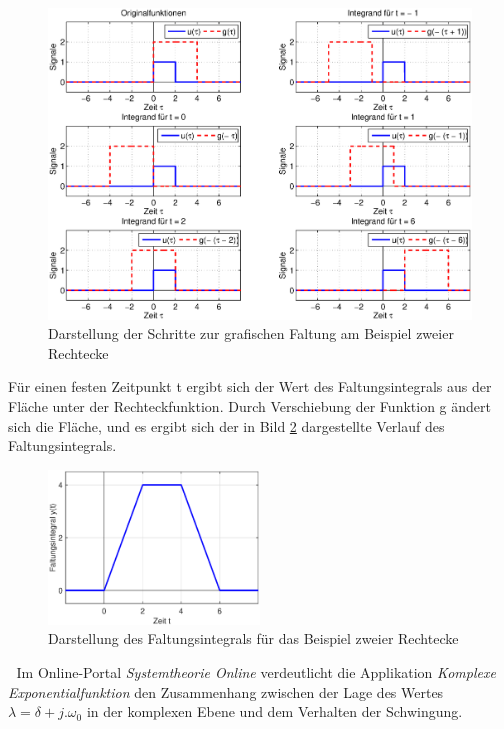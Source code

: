 \begin{figure}[H]
  \centerline{\includegraphics[width=1\textwidth]{Kapitel2/Bilder/image18}}
  \caption{Darstellung der Schritte zur grafischen Faltung am Beispiel zweier Rechtecke}
  \label{fig:FaltungGrafischRechtecke}
\end{figure}

\noindent Für einen festen Zeitpunkt t ergibt sich der Wert des Faltungsintegrals aus der Fläche unter der Rechteckfunktion. Durch Verschiebung der Funktion g ändert sich die Fläche, und es ergibt sich der in 
Bild \ref{fig:FaltungGrafischRechteckeBSP} dargestellte Verlauf des Faltungsintegrals.

\begin{figure}[H]
  \centerline{\includegraphics[width=0.5\textwidth]{Kapitel2/Bilder/image19}}
  \caption{Darstellung des Faltungsintegrals für das Beispiel zweier Rechtecke}
  \label{fig:FaltungGrafischRechteckeBSP}
\end{figure}

\noindent
\noindent

\textcolor{white}{.}\newline
\noindent Im Online-Portal \textit{Systemtheorie Online} verdeutlicht die Applikation \textit{Komplexe Exponentialfunktion} den Zusammenhang zwischen der Lage des Wertes $\lambda = \delta + j.\omega{}_{0}$ in der komplexen Ebene und dem Verhalten der Schwingung.\newline

